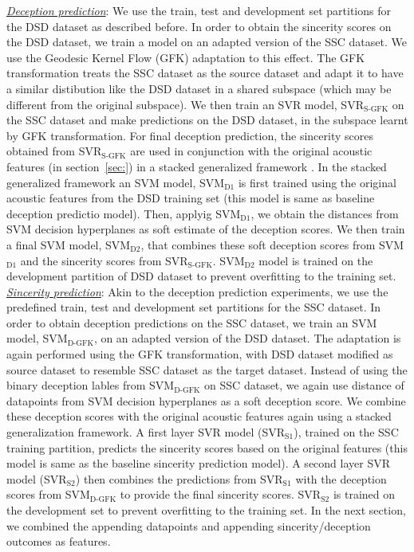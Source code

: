 \documentclass{article}
\begin{document}
\noindent\underline{\it Deception prediction}: 
We use the train, test and development set partitions for the DSD dataset as described before.
In order to obtain the sincerity scores on the DSD dataset, we train a model on an adapted version of the SSC dataset.
We use the Geodesic Kernel Flow (GFK) adaptation \cite{} to this effect.
The GFK transformation treats the SSC dataset as the source dataset and adapt it to have a similar distibution like the DSD dataset in a shared subspace (which may be different from the original subspace). 
We then train an SVR model, SVR$_\text{S-GFK}$ on the SSC dataset and make predictions on the DSD dataset, in the subspace learnt by GFK transformation.
For final deception prediction, the sincerity scores obtained from SVR$_\text{S-GFK}$ are used in conjunction with the original acoustic features (in section~\ref{sec:}) in a stacked generalized framework \cite{}.
In the stacked generalized framework an SVM model, SVM$_\text{D1}$ is first trained using the original acoustic features from the DSD training set (this model is same as baseline deception predictio model).
Then, applyig SVM$_\text{D1}$, we obtain the distances from SVM decision hyperplanes as soft estimate of the deception scores. 
We then train a final SVM model, SVM$_\text{D2}$, that combines these soft deception scores from SVM$_\text{D1}$ and the sincerity scores from SVR$_\text{S-GFK}$.
SVM$_\text{D2}$ model is trained on the development partition of DSD dataset to prevent overfitting to the training set. 
\\

\noindent\underline{\it Sincerity prediction}:
Akin to the deception prediction experiments, we use the predefined train, test and development set partitions for the SSC dataset.
In order to obtain deception predictions on the SSC dataset, we train an SVM model, SVM$_\text{D-GFK}$, on an adapted version of the DSD dataset.
The adaptation is again performed using the GFK transformation, with DSD dataset modified as source dataset to resemble SSC dataset as the target dataset.
Instead of using the binary deception lables from SVM$_\text{D-GFK}$ on SSC dataset, we again use distance of datapoints from SVM decision hyperplanes as a soft deception score. 
We combine these deception scores with the original acoustic features again using a stacked generalization framework. 
A first layer SVR model (SVR$_\text{S1}$), trained on the SSC training partition, predicts the sincerity scores based on the original features (this model is same as the baseline sincerity prediction model). 
A second layer SVR model (SVR$_\text{S2}$) then combines the predictions from SVR$_\text{S1}$ with the deception scores from SVM$_\text{D-GFK}$ to provide the final sincerity scores.  
SVR$_\text{S2}$ is trained on the development set to prevent overfitting to the training set. 
In the next section, we combined the appending datapoints and appending sincerity/deception outcomes as features. 
\end{document}
